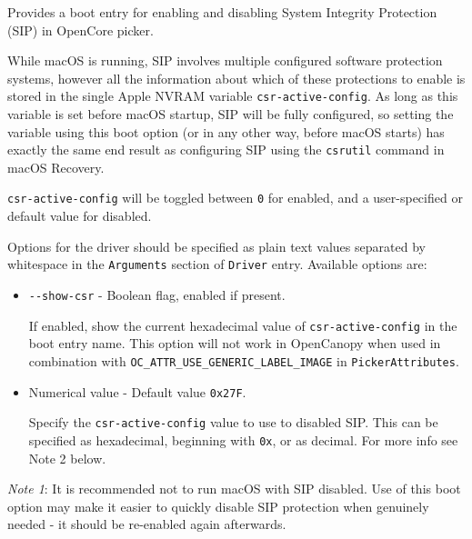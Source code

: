 \documentclass[]{article}
\providecommand{\tightlist}{%
  \setlength{\itemsep}{0pt}\setlength{\parskip}{0pt}}
\begin{document}
Provides a boot entry for enabling and disabling System Integrity Protection (SIP) in OpenCore picker.

While macOS is running, SIP involves multiple configured software protection systems, however
all the information about which of these protections to enable is stored in the single Apple NVRAM variable
\texttt{csr-active-config}. As long as this variable is set before macOS startup,
SIP will be fully configured, so setting the variable using this boot option
(or in any other way, before macOS starts) has exactly the same end result as configuring SIP using the
\texttt{csrutil} command in macOS Recovery.

\texttt{csr-active-config}  will be toggled between \texttt{0} for enabled, and a user-specified or
default value for disabled.

Options for the driver should be specified as plain text values separated by whitespace in the
\texttt{Arguments} section of \texttt{Driver} entry. Available options are:

\begin{itemize}
\tightlist
  \item \texttt{-{}-show-csr} - Boolean flag, enabled if present. \medskip

  If enabled, show the current hexadecimal value of \texttt{csr-active-config} in the boot entry name.
  This option will not work in OpenCanopy when used in combination with \texttt{OC\_ATTR\_USE\_GENERIC\_LABEL\_IMAGE}
  in \texttt{PickerAttributes}. \medskip

  \item Numerical value - Default value \texttt{0x27F}. \medskip

  Specify the \texttt{csr-active-config} value to use to disabled SIP. This can be specified as
  hexadecimal, beginning with \texttt{0x}, or as decimal. For more info see Note 2 below. \medskip
\end{itemize}

\emph{Note 1}: It is recommended not to run macOS with
SIP disabled. Use of this boot option may make it easier to quickly disable SIP
protection when genuinely needed - it should be re-enabled again afterwards.
\end{document}
